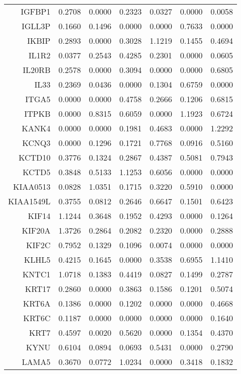 \begin{longtable}{rrrrrrr}
  IGFBP1 & 0.2708 & 0.0000 & 0.2323 & 0.0327 & 0.0000 & 0.0058 \\ 
  IGLL3P & 0.1660 & 0.1496 & 0.0000 & 0.0000 & 0.7633 & 0.0000 \\ 
  IKBIP & 0.2893 & 0.0000 & 0.3028 & 1.1219 & 0.1455 & 0.4694 \\ 
  IL1R2 & 0.0377 & 0.2543 & 0.4285 & 0.2301 & 0.0000 & 0.0605 \\ 
  IL20RB & 0.2578 & 0.0000 & 0.3094 & 0.0000 & 0.0000 & 0.6805 \\ 
  IL33 & 0.2369 & 0.0436 & 0.0000 & 0.1304 & 0.6759 & 0.0000 \\ 
  ITGA5 & 0.0000 & 0.0000 & 0.4758 & 0.2666 & 0.1206 & 0.6815 \\ 
  ITPKB & 0.0000 & 0.8315 & 0.6059 & 0.0000 & 1.1923 & 0.6724 \\ 
  KANK4 & 0.0000 & 0.0000 & 0.1981 & 0.4683 & 0.0000 & 1.2292 \\ 
  KCNQ3 & 0.0000 & 0.1296 & 0.1721 & 0.7768 & 0.0916 & 0.5160 \\ 
  KCTD10 & 0.3776 & 0.1324 & 0.2867 & 0.4387 & 0.5081 & 0.7943 \\ 
  KCTD5 & 0.3848 & 0.5133 & 1.1253 & 0.6056 & 0.0000 & 0.0000 \\ 
  KIAA0513 & 0.0828 & 1.0351 & 0.1715 & 0.3220 & 0.5910 & 0.0000 \\ 
  KIAA1549L & 0.3755 & 0.0812 & 0.2646 & 0.6647 & 0.1501 & 0.6423 \\ 
  KIF14 & 1.1244 & 0.3648 & 0.1952 & 0.4293 & 0.0000 & 0.1264 \\ 
  KIF20A & 1.3726 & 0.2864 & 0.2082 & 0.2320 & 0.0000 & 0.2888 \\ 
  KIF2C & 0.7952 & 0.1329 & 0.1096 & 0.0074 & 0.0000 & 0.0000 \\ 
  KLHL5 & 0.4215 & 0.1645 & 0.0000 & 0.3538 & 0.6955 & 1.1410 \\ 
  KNTC1 & 1.0718 & 0.1383 & 0.4419 & 0.0827 & 0.1499 & 0.2787 \\ 
  KRT17 & 0.2860 & 0.0000 & 0.3863 & 0.1586 & 0.1201 & 0.5074 \\ 
  KRT6A & 0.1386 & 0.0000 & 0.1202 & 0.0000 & 0.0000 & 0.4668 \\ 
  KRT6C & 0.1187 & 0.0000 & 0.0000 & 0.0000 & 0.0000 & 0.1640 \\ 
  KRT7 & 0.4597 & 0.0020 & 0.5620 & 0.0000 & 0.1354 & 0.4370 \\ 
  KYNU & 0.6104 & 0.0894 & 0.0693 & 0.5431 & 0.0000 & 0.2790 \\ 
  LAMA5 & 0.3670 & 0.0772 & 1.0234 & 0.0000 & 0.3418 & 0.1832 \\ 

\end{longtable}
